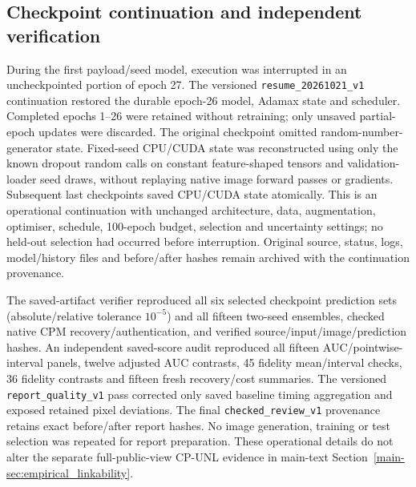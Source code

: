 \documentclass[journal]{IEEEtran}
\theoremstyle{definition}
\theoremstyle{game}
\begin{document}
\subsection{Checkpoint continuation and independent verification}
During the first payload/seed model, execution was interrupted in an
uncheckpointed portion of epoch 27. The versioned
\texttt{resume\_20261021\_v1} continuation restored the durable epoch-26
model, Adamax state and scheduler. Completed epochs 1--26 were retained
without retraining; only unsaved partial-epoch updates were discarded.
The original checkpoint omitted random-number-generator state. Fixed-seed
CPU/CUDA state was reconstructed using only the known dropout random
calls on constant feature-shaped tensors and validation-loader seed
draws, without replaying native image forward passes or gradients.
Subsequent last checkpoints saved CPU/CUDA state atomically. This is an
operational continuation with unchanged architecture, data, augmentation,
optimiser, schedule, 100-epoch budget, selection and uncertainty settings;
no held-out selection had occurred before interruption. Original source,
status, logs, model/history files and before/after hashes remain archived
with the continuation provenance.

The saved-artifact verifier reproduced all six selected checkpoint
prediction sets (absolute/relative tolerance $10^{-5}$) and all fifteen
two-seed ensembles, checked native CPM recovery/authentication, and
verified source/input/image/prediction hashes. An independent saved-score
audit reproduced all fifteen AUC/pointwise-interval panels, twelve
adjusted AUC contrasts, 45 fidelity mean/interval checks, 36 fidelity
contrasts and fifteen fresh recovery/cost summaries. The versioned
\texttt{report\_quality\_v1} pass corrected only saved baseline timing
aggregation and exposed retained pixel deviations. The final
\texttt{checked\_review\_v1} provenance retains exact before/after report
hashes. No image generation, training or test selection was repeated for
report preparation. These operational details do not alter the
separate full-public-view CP-UNL evidence in main-text
Section~\ref{main-sec:empirical_linkability}.
\end{document}
